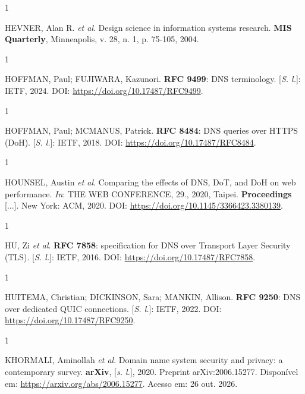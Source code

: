 \documentclass[12pt,a4paper]{article}
\begin{document}
\begin{spacing}{1}\raggedright\noindent HEVNER, Alan R. \textit{et al}. Design science in information systems research. \textbf{MIS Quarterly}, Minneapolis, v. 28, n. 1, p. 75-105, 2004.\par\vspace{12pt}\end{spacing}
\begin{spacing}{1}\raggedright\noindent HOFFMAN, Paul; FUJIWARA, Kazunori. \textbf{RFC 9499}: DNS terminology. [\textit{S. l.}]: IETF, 2024. DOI: \url{https://doi.org/10.17487/RFC9499}.\par\vspace{12pt}\end{spacing}
\begin{spacing}{1}\raggedright\noindent HOFFMAN, Paul; MCMANUS, Patrick. \textbf{RFC 8484}: DNS queries over HTTPS (DoH). [\textit{S. l.}]: IETF, 2018. DOI: \url{https://doi.org/10.17487/RFC8484}.\par\vspace{12pt}\end{spacing}
\begin{spacing}{1}\raggedright\noindent HOUNSEL, Austin \textit{et al}. Comparing the effects of DNS, DoT, and DoH on web performance. \textit{In}: THE WEB CONFERENCE, 29., 2020, Taipei. \textbf{Proceedings} [...]. New York: ACM, 2020. DOI: \url{https://doi.org/10.1145/3366423.3380139}.\par\vspace{12pt}\end{spacing}
\begin{spacing}{1}\raggedright\noindent HU, Zi \textit{et al}. \textbf{RFC 7858}: specification for DNS over Transport Layer Security (TLS). [\textit{S. l.}]: IETF, 2016. DOI: \url{https://doi.org/10.17487/RFC7858}.\par\vspace{12pt}\end{spacing}
\begin{spacing}{1}\raggedright\noindent HUITEMA, Christian; DICKINSON, Sara; MANKIN, Allison. \textbf{RFC 9250}: DNS over dedicated QUIC connections. [\textit{S. l.}]: IETF, 2022. DOI: \url{https://doi.org/10.17487/RFC9250}.\par\vspace{12pt}\end{spacing}
\begin{spacing}{1}\raggedright\noindent KHORMALI, Aminollah \textit{et al}. Domain name system security and privacy: a contemporary survey. \textbf{arXiv}, [\textit{s. l.}], 2020. Preprint arXiv:2006.15277. Disponível em: \url{https://arxiv.org/abs/2006.15277}. Acesso em: 26 out. 2026.\par\vspace{12pt}\end{spacing}
\end{document}
